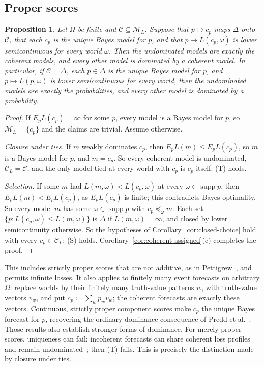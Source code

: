 \documentclass[11pt]{article}
\newtheorem{proposition}[theorem]{Proposition}
\theoremstyle{definition}
\newcommand{\M}{\mathcal M}
\newcommand{\C}{\mathcal C}
\newcommand{\supp}{\operatorname{supp}}
\begin{document}
\subsection{Proper scores}
\begin{proposition}\label{prop:short-proper}
{\color{red}Let $\Omega$ be finite and $\C\subseteq\M_L$. Suppose that $p\mapsto c_p$ maps $\Delta$ onto $\C$, that each $c_p$ is the unique Bayes model for $p$, and that $p\mapsto L(c_p,\omega)$ is lower semicontinuous for every world $\omega$. Then the undominated models are exactly the coherent models, and every other model is dominated by a coherent model. In particular, if $\C=\Delta$, each $p\in\Delta$ is the unique Bayes model for $p$, and $p\mapsto L(p,\omega)$ is lower semicontinuous for every world, then the undominated models are exactly the probabilities, and every other model is dominated by a probability.}
\end{proposition}
\begin{proof}
{\color{red}If $E_pL(c_p)=\infty$ for some $p$, every model is a Bayes model for $p$, so $\M_L=\{c_p\}$ and the claims are trivial. Assume otherwise.

\emph{Closure under ties.} If $m$ weakly dominates $c_p$, then $E_pL(m)\le E_pL(c_p)$, so $m$ is a Bayes model for $p$, and $m=c_p$. So every coherent model is undominated, $\C_L=\C$, and the only model tied at every world with $c_p$ is $c_p$ itself: (T) holds.

\emph{Selection.} If some $m$ had $L(m,\omega)<L(c_p,\omega)$ at every $\omega\in\supp p$, then $E_pL(m)<E_pL(c_p)$, as $E_pL(c_p)$ is finite; this contradicts Bayes optimality. So every model $m$ has some $\omega\in\supp p$ with $c_p\preceq_\omega m$. Each set $\{p:L(c_p,\omega)\le L(m,\omega)\}$ is $\Delta$ if $L(m,\omega)=\infty$, and closed by lower semicontinuity otherwise. So the hypotheses of Corollary~\ref{cor:closed-choice} hold with every $c_p\in\C_L$: (S) holds. Corollary~\ref{cor:coherent-assigned}(c) completes the proof.}
\end{proof}
This includes strictly proper scores that are not additive, as in Pettigrew~\cite{Pettigrew2022}, and permits infinite losses. {\color{red}It also applies to finitely many event forecasts on arbitrary $\Omega$: replace worlds by their finitely many truth-value patterns $w$, with truth-value vectors $v_w$, and put $c_p\coloneqq\sum_wp_wv_w$; the coherent forecasts are exactly these vectors. Continuous, strictly proper component scores make $c_p$ the unique Bayes forecast for $p$, recovering} the ordinary-dominance consequence of Predd et al.~\cite{Predd2009}. Those results also establish stronger forms of dominance. For merely proper scores, uniqueness can fail: incoherent forecasts can share coherent loss profiles and remain undominated~\cite{SSK2009}{\color{red}; then (T) fails}. This is precisely the distinction made by closure under ties.
\end{document}
